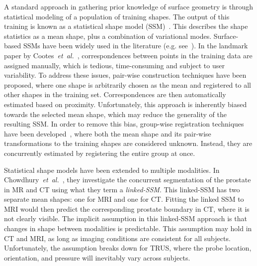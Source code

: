 \documentclass[journal]{IEEEtran}
\begin{document}
A standard approach in gathering prior knowledge of surface geometry is through statistical modeling of a population of training shapes.  The output of this training is known as a statistical shape model (SSM)~\cite{Heimann09a}. This describes the shape statistics as a mean shape, plus a combination of variational modes. Surface-based SSMs have been widely used in the literature (e.g. see~\cite{Chui04a,Davies02a,Durrleman09a,Rasoulian12b}). In the landmark paper by Cootes~\textit{et~al.}~\cite{Cootes95a}, correspondences between points in the training data are assigned manually, which is tedious, time-consuming and subject to user variability. To address these issues, pair-wise construction techniques have been proposed, where one shape is arbitrarily chosen as the mean and registered to all other shapes in the training set.  Correspondences are then automatically estimated based on proximity. Unfortunately, this approach is inherently biased towards the selected mean shape, which may reduce the generality of the resulting SSM. In order to remove this bias, group-wise registration techniques have been developed~\cite{Balci07a,Rasoulian12b}, where both the mean shape and its pair-wise transformations to the training shapes are considered unknown. Instead, they are concurrently estimated by registering the entire group at once.  

Statistical shape models have been extended to multiple modalities.  In Chowdhury~\textit{et~al.}~\cite{Chowdhury12a}, they investigate the concurrent segmentation of the prostate in MR and CT using what they term a \emph{linked-SSM}.  This linked-SSM has two separate mean shapes: one for MRI and one for CT.  Fitting the linked SSM to MRI would then predict the corresponding prostate boundary in CT, where it is not clearly visible.  The implicit assumption in this linked-SSM approach is that changes in shape between modalities is predictable.  This assumption may hold in CT and MRI, as long as imaging conditions are consistent for all subjects.  Unfortunately, the assumption breaks down for TRUS, where the probe location, orientation, and pressure will inevitably vary across subjects.   
\end{document}
